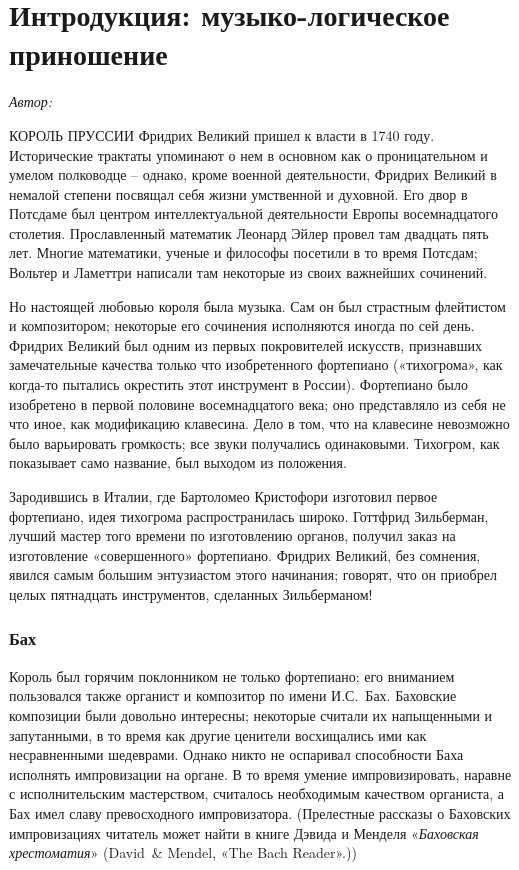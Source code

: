 \documentclass[../main.tex]{subfiles}
\begin{document}

\setcounter{chapter}{-1}
\chapter{Интродукция: музыко-логическое приношение}

\emph{Автор:}

КОРОЛЬ ПРУССИИ Фридрих Великий пришел к власти в 1740 году. Исторические трактаты упоминают о нем в основном как о проницательном и умелом полководце \--- однако, кроме военной деятельности, Фридрих Великий в немалой степени посвящал себя жизни умственной и духовной. Его двор в Потсдаме был центром интеллектуальной деятельности Европы восемнадцатого столетия. Прославленный математик Леонард Эйлер провел там двадцать пять лет. Многие математики, ученые и философы посетили в то время Потсдам; Вольтер и Ламеттри написали там некоторые из своих важнейших сочинений.

Но настоящей любовью короля была музыка. Сам он был страстным флейтистом и композитором; некоторые его сочинения исполняются иногда по сей день. Фридрих Великий был одним из первых покровителей искусств, признавших замечательные качества только что изобретенного фортепиано («тихогрома», как когда-то пытались окрестить этот инструмент в России). Фортепиано было изобретено в первой половине восемнадцатого века; оно представляло из себя не что иное, как модификацию клавесина. Дело в том, что на клавесине невозможно было варьировать громкость; все звуки получались одинаковыми. Тихогром, как показывает само название, был выходом из положения.

Зародившись в Италии, где Бартоломео Кристофори изготовил первое фортепиано, идея тихогрома распространилась широко. Готтфрид Зильберман, лучший мастер того времени по изготовлению органов, получил заказ на изготовление «совершенного» фортепиано. Фридрих Великий, без сомнения, явился самым большим энтузиастом этого начинания; говорят, что он приобрел целых пятнадцать инструментов, сделанных Зильберманом!


\subsection{Бах}

Король был горячим поклонником не только фортепиано; его вниманием пользовался также органист и композитор по имени И.С.~Бах. Баховские композиции были довольно интересны; некоторые считали их напыщенными и запутанными, в то время как другие ценители восхищались ими как несравненными шедеврами. Однако никто не оспаривал способности Баха исполнять импровизации на органе. В то время умение импровизировать, наравне с исполнительским мастерством, считалось необходимым качеством органиста, а Бах имел славу превосходного импровизатора. (Прелестные рассказы о Баховских импровизациях читатель может найти в книге Дэвида и Менделя «\emph{Баховская хрестоматия}» (David~\& Mendel, «The Bach Reader».))
\end{document}

